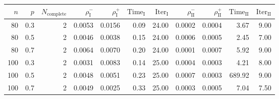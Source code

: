 \begin{tabular}{rrr rrrrrrrr}
\toprule
$n$ & $p$ & $N_{\mathrm{complete}}$ & $\rho^-_{\mathrm I}$ & $\rho^+_{\mathrm I}$ & $\mathrm{Time}_{\mathrm I}$ & $\mathrm{Iter}_{\mathrm I}$ & $\rho^-_{\mathrm{II}}$ & $\rho^+_{\mathrm{II}}$ & $\mathrm{Time}_{\mathrm{II}}$ & $\mathrm{Iter}_{\mathrm{II}}$ \\
\midrule
80 & 0.3 & 2 & 0.0053 & 0.0156 & 0.09 & 24.00 & 0.0002 & 0.0004 & 3.67 & 9.00 \\
80 & 0.5 & 2 & 0.0046 & 0.0038 & 0.15 & 24.00 & 0.0006 & 0.0005 & 2.45 & 7.00 \\
80 & 0.7 & 2 & 0.0064 & 0.0070 & 0.20 & 24.00 & 0.0001 & 0.0007 & 5.92 & 9.00 \\
100 & 0.3 & 2 & 0.0031 & 0.0083 & 0.14 & 25.00 & 0.0004 & 0.0003 & 4.21 & 8.00 \\
100 & 0.5 & 2 & 0.0048 & 0.0051 & 0.23 & 25.00 & 0.0007 & 0.0003 & 689.92 & 9.00 \\
100 & 0.7 & 2 & 0.0049 & 0.0025 & 0.33 & 25.00 & 0.0003 & 0.0005 & 7.04 & 7.50 \\
\bottomrule
\end{tabular}

